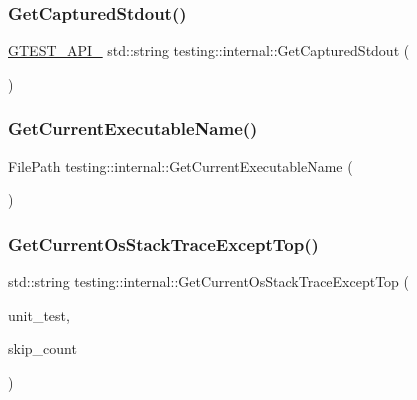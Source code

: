 \subsubsection{\texorpdfstring{GetCapturedStdout()}{GetCapturedStdout()}}
{\footnotesize\ttfamily \mbox{\hyperlink{_obj__test_2lib_2googletest-release-1_88_81_2googletest_2include_2gtest_2internal_2gtest-port_8h_aa73be6f0ba4a7456180a94904ce17790}{G\+T\+E\+S\+T\+\_\+\+A\+P\+I\+\_\+}} std\+::string testing\+::internal\+::\+Get\+Captured\+Stdout (\begin{DoxyParamCaption}{ }\end{DoxyParamCaption})}

\mbox{\label{namespacetesting_1_1internal_a7a2bbf069f75bc99873976ad6fc356ad}} 
\subsubsection{\texorpdfstring{GetCurrentExecutableName()}{GetCurrentExecutableName()}}
{\footnotesize\ttfamily File\+Path testing\+::internal\+::\+Get\+Current\+Executable\+Name (\begin{DoxyParamCaption}{ }\end{DoxyParamCaption})}

\mbox{\label{namespacetesting_1_1internal_aeb475922b8cd1e6c60ac052bbc396e62}} 
\subsubsection{\texorpdfstring{GetCurrentOsStackTraceExceptTop()}{GetCurrentOsStackTraceExceptTop()}}
{\footnotesize\ttfamily std\+::string testing\+::internal\+::\+Get\+Current\+Os\+Stack\+Trace\+Except\+Top (\begin{DoxyParamCaption}\item[{\mbox{\hyperlink{classtesting_1_1_unit_test}{Unit\+Test}} $\ast$}]{unit\+\_\+test,  }\item[{int}]{skip\+\_\+count }\end{DoxyParamCaption})}

